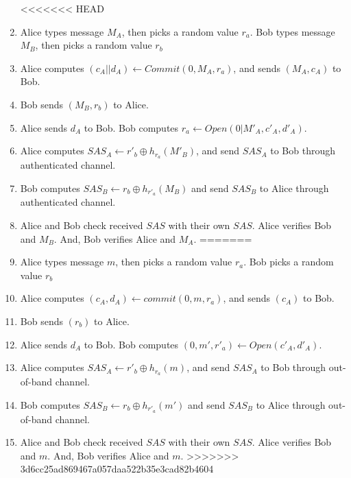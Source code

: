 \begin{enumerate}
<<<<<<< HEAD
\item Alice types message $M_A$, then picks a random value $r_a$. Bob types message $M_B$, then picks a random value $r_b$
\item Alice computes $(c_A||d_A) \leftarrow Commit(0,M_A,r_a)$, and sends $(M_A,c_A)$ to Bob.
\item Bob sends $(M_B,r_b)$ to Alice.
\item Alice sends $d_A$ to Bob. Bob computes $r_a \leftarrow Open(0|M'_A,c'_A,d'_A)$. 
\item Alice computes $SAS_A \leftarrow r'_b \oplus h_{r_a}(M'_B)$, and send $SAS_A$ to Bob through authenticated channel. 
\item Bob computes $SAS_B \leftarrow r_b \oplus h_{r'_a}(M_B)$ and send $SAS_B$ to Alice through authenticated channel. 
\item Alice and Bob check received $SAS$ with their own $SAS$. Alice verifies Bob and $M_B$. And, Bob verifies Alice and $M_A$.
=======
\item Alice types message $m$, then picks a random value $r_a$. Bob  picks a random value $r_b$
\item Alice computes $(c_A,d_A) \leftarrow commit(0,m,r_a)$, and sends $(c_A)$ to Bob.
\item Bob sends $(r_b)$ to Alice.
\item Alice sends $d_A$ to Bob. Bob computes $(0,m',r'_a) \leftarrow Open(c'_A,d'_A)$. 
\item Alice computes $SAS_A \leftarrow r'_b \oplus h_{r_a}(m)$, and send $SAS_A$ to Bob through out-of-band channel. 
\item Bob computes $SAS_B \leftarrow r_b \oplus h_{r'_a}(m')$ and send $SAS_B$ to Alice through out-of-band channel. 
\item Alice and Bob check received $SAS$ with their own $SAS$. Alice verifies Bob and $m$. And, Bob verifies Alice and $m$.
>>>>>>> 3d6cc25ad869467a057daa522b35e3cad82b4604
\end{enumerate}

